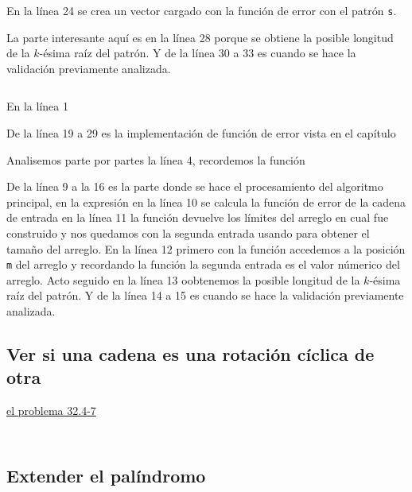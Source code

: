 En la línea 24 se crea un vector cargado con la función de error con el patrón \texttt{s}.

La parte interesante aquí es en la línea 28 porque se obtiene la posible longitud de la $k$-ésima
raíz del patrón. Y de la línea 30 a 33 es cuando se hace la validación previamente analizada.

\inputminted[linenos, frame=lines]{haskell}{problemas/haskell/FINDSR.hs}
\pagebreak


En la línea 1 %

De la línea 19 a 29 es la implementación de función de error vista en el capítulo %

Analisemos parte por partes la línea 4, recordemos la función \\

De la línea 9 a la 16 es la parte donde se hace el procesamiento del algoritmo principal,
en la expresión  %
en la línea 10 se calcula la función de error de la cadena de entrada
en la línea 11 la función  devuelve los límites del arreglo en cual fue construido y nos quedamos
con la segunda entrada usando  para obtener el tamaño del arreglo.
En la línea 12 primero con la función  accedemos a la posición \texttt{m} del arreglo y recordando
la función  la segunda entrada es el valor númerico del arreglo.
Acto seguido en la línea 13 oobtenemos  la posible longitud de la $k$-ésima
raíz del patrón. Y de la línea 14 a 15 es cuando se hace la validación previamente analizada.


\subsection{Ver si una cadena es una rotación cíclica de otra}
\hyperlink{cyclic_rotation}{el problema 32.4-7}


\inputminted[linenos, frame=lines]{cpp}{problemas/cpp/EC_WORLD.cpp}
\pagebreak

\inputminted[linenos, frame=lines]{haskell}{problemas/haskell/EC_WORLD.hs}
\pagebreak

\subsection{Extender el palíndromo}


